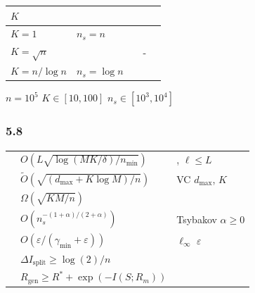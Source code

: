 \documentclass[
  12pt,
]{article}
\begin{document}
\begin{longtable}[]{@{}lllll@{}}
\toprule\noalign{}
 \(K\) &  &  &  &  \\
\midrule\noalign{}
\endhead
\bottomrule\noalign{}
\endlastfoot
\(K=1\) & \(n_s=n\) &  &  &  \\
\(K=\sqrt{n}\) &  &  & - &  \\
\(K=n/\log n\) & \(n_s=\log n\) &  &  &
 \\
\end{longtable}

\textbf{} \(n=10^5\) \(K \in [10, 100]\)
 \(n_s \in [10^3, 10^4]\)

\subsubsection{5.8 }\label{ux8fb9ux754cux6c47ux603bux8868}

\begin{longtable}[]{@{}
  >{\raggedright\arraybackslash}p{}
  >{\raggedright\arraybackslash}p{}
  >{\raggedright\arraybackslash}p{}@{}}
\toprule\noalign{}
\begin{minipage}[b]{\linewidth}\raggedright

\end{minipage} & \begin{minipage}[b]{\linewidth}\raggedright

\end{minipage} & \begin{minipage}[b]{\linewidth}\raggedright

\end{minipage} \\
\midrule\noalign{}
\endhead
\bottomrule\noalign{}
\endlastfoot
 & \(O(L\sqrt{\log(MK/\delta)/n_{\min}})\) & ,
\(\ell \leq L\) \\
 & \(\tilde{O}(\sqrt{(d_{\max} + K\log M)/n})\) & VC 
\(d_{\max}\),  \(K\) \\
 & \(\Omega(\sqrt{KM/n})\) &  \\
 & \(O(n_s^{-(1+\alpha)/(2+\alpha)})\) & Tsybakov 
\(\alpha \geq 0\) \\
 & \(O(\varepsilon / (\gamma_{\min} + \varepsilon))\) &
\(\ell_\infty\)  \(\varepsilon\) \\
 & \(\Delta I_{\text{split}} \geq \log(2)/n\) &
 \\
 & \(R_{\text{gen}} \geq R^* + \exp(-I(S;R_m))\) &
 \\
\end{longtable}
\end{document}
